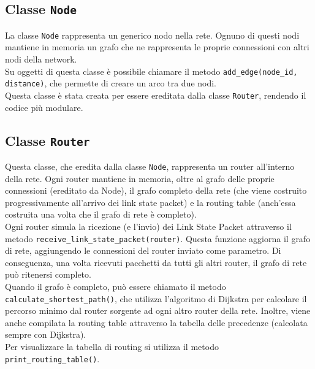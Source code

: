 \documentclass{article}
\begin{document}
\subsection{Classe \texttt{Node}}
La classe \texttt{Node} rappresenta un generico nodo nella rete. Ognuno di questi nodi mantiene in memoria un grafo che ne rappresenta le proprie connessioni con altri nodi della network.\\
Su oggetti di questa classe è possibile chiamare il metodo \texttt{add\_edge(node\_id, distance)}, che permette di creare un arco tra due nodi.\\
Questa classe è stata creata per essere ereditata dalla classe \texttt{Router}, rendendo il codice più modulare.

\subsection{Classe \texttt{Router}}
Questa classe, che eredita dalla classe \texttt{Node}, rappresenta un router all'interno della rete. Ogni router mantiene in memoria, oltre al grafo delle proprie connessioni (ereditato da Node), il grafo completo della rete (che viene costruito progressivamente all'arrivo dei link state packet) e la routing table (anch'essa costruita una volta che il grafo di rete è completo).\\
Ogni router simula la ricezione (e l'invio) dei Link State Packet attraverso il metodo \texttt{receive\_link\_state\_packet(router)}. Questa funzione aggiorna il grafo di rete, aggiungendo le connessioni del router inviato come parametro. Di conseguenza, una volta ricevuti pacchetti da tutti gli altri router, il grafo di rete può ritenersi completo.\\
Quando il grafo è completo, può essere chiamato il metodo \texttt{calculate\_shortest\_path()}, che utilizza l'algoritmo di Dijkstra per calcolare il percorso minimo dal router sorgente ad ogni altro router della rete. Inoltre, viene anche compilata la routing table attraverso la tabella delle precedenze (calcolata sempre con Dijkstra).\\
Per visualizzare la tabella di routing si utilizza il metodo \texttt{print\_routing\_table()}.
\end{document}
